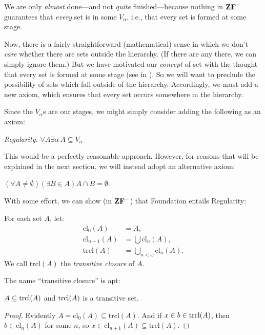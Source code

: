 \documentclass[../../../include/open-logic-section]{subfiles}
\begin{document}


We are only \emph{almost} done---and not \emph{quite} finished---because nothing in
$\mathbf{ZF}^{-}$ guarantees that \emph{every} set is in some $V_\alpha$,
i.e., that every set is formed at some stage. 

Now, there is a fairly straightforward (mathematical) sense in which
we don't \emph{care} whether there are sets outside the hierarchy. (If
there are any there, we can simply ignore them.) But we have motivated
our \emph{concept} of set with the thought that every set is formed at
some stage (see \stageshier{} in ). So
we will want to preclude the possibility of sets which fall outside of
the hierarchy. Accordingly, we must add a new axiom, which ensures
that every set occurs somewhere in the hierarchy. 

Since the $V_\alpha$s are our stages, we might simply consider adding
the following as an axiom:

\begin{defish}
\emph{Regularity.} $\forall A \exists \alpha\, A \subseteq V_\alpha$
\end{defish}

This would be a perfectly reasonable approach. However, for reasons
that will be explained in the next section, we will instead adopt an
alternative axiom:

\begin{axiom}[Foundation]
$(\forall A \neq \emptyset)(\exists B \in A)A \cap B = \emptyset$.
\end{axiom}

With some effort, we can show (in $\mathbf{ZF}^{-}$) that Foundation entails Regularity:
\begin{defn}
For each set $A$, let:
\begin{align*}
	\text{cl}_0(A) &= A,\\
	\text{cl}_{n+1}(A) &= \bigcup \text{cl}_n(A),\\
	\text{trcl}(A) &= \bigcup_{n < \omega} \text{cl}_{n}(A).
\end{align*}
We call $\text{trcl}(A)$ the \emph{transitive closure} of $A$.
\end{defn}
\noindent
The name ``transitive closure'' is apt:
\begin{prop}
$A \subseteq \mathrm{trcl}(A)$ and $\mathrm{trcl}(A)$ is a transitive set. 
\end{prop}

\begin{proof}
Evidently $A = \text{cl}_0(A) \subseteq \text{trcl}(A)$. And if $x
\in b \in \mathrm{trcl}(A)$,  then $b \in \text{cl}_n(A)$ for some $n$, so $x
\in \text{cl}_{n+1}(A) \subseteq \text{trcl}(A)$. 
\end{proof}
\end{document}
